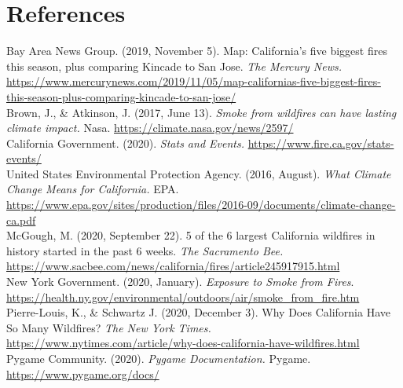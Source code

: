 \documentclass[fontsize=11pt]{article}
\begin{document}
\section*{References}
\begin{hangparas}{0.25in}{1}
Bay Area News Group. (2019, November 5). Map: California’s five biggest fires this season, plus comparing Kincade to San Jose. \emph{The Mercury News.} \url{https://www.mercurynews.com/2019/11/05/map-californias-five-biggest-fires-this-season-plus-comparing-kincade-to-san-jose/}\\

Brown, J., \& Atkinson, J. (2017, June 13). \emph{Smoke from wildfires can have lasting climate impact.} Nasa. \url{https://climate.nasa.gov/news/2597/}\\

California Government. (2020). \emph{Stats and Events.} \url{https://www.fire.ca.gov/stats-events/}\\

United States Environmental Protection Agency. (2016, August). \emph{What Climate Change Means for  California.} EPA. \url{https://www.epa.gov/sites/production/files/2016-09/documents/climate-change-ca.pdf}\\

McGough, M. (2020, September 22). 5 of the 6 largest California wildfires in history started in the past 6 weeks. \emph{The Sacramento Bee.} \url{https://www.sacbee.com/news/california/fires/article245917915.html}\\

New York Government. (2020, January). \emph{Exposure to Smoke from Fires}. \url{https://health.ny.gov/environmental/outdoors/air/smoke_from_fire.htm}\\

Pierre-Louis, K., \& Schwartz J. (2020, December 3). Why Does California Have So Many Wildfires? \emph{The New York Times.} \url{https://www.nytimes.com/article/why-does-california-have-wildfires.html}\\

Pygame Community. (2020). \emph{Pygame Documentation.} Pygame. \url{https://www.pygame.org/docs/}

\end{hangparas}
\end{document}
